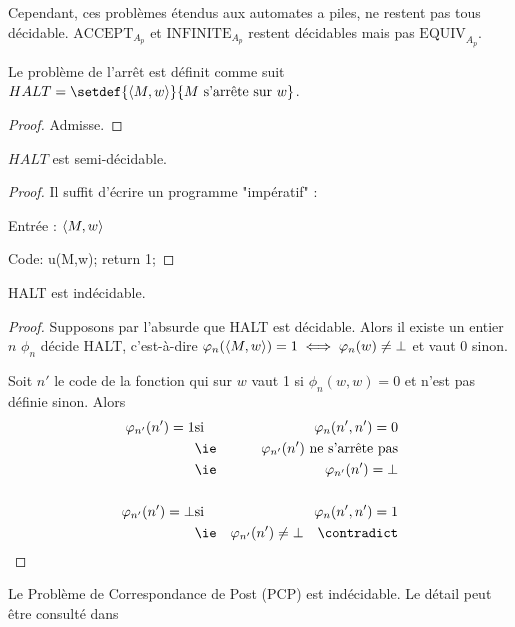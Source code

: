 Cependant, ces problèmes étendus aux automates a piles, ne restent pas tous décidable.
$\text{ACCEPT}_{A_p}$ et $\text{INFINITE}_{A_p}$ restent décidables mais pas $\text{EQUIV}_{A_p}$.

\begin{definition}
	Le problème de l'arrêt est définit comme suit $HALT = \setdef {\encode{M,w}} {M \text{ s'arrête sur } w}$.
\end{definition}

\begin{proof}
	Admisse.
\end{proof}

\begin{prop}
	$HALT$ est semi-décidable.
\end{prop}

\begin{proof}
	Il suffit d'écrire un programme "impératif" :

	Entrée : $\left\langle M,w\right\rangle$

	Code:
	u(M,w);
	return 1;

\end{proof}

\begin{prop}
	HALT est indécidable.
\end{prop}

\begin{proof}
	Supposons par l'absurde que HALT est décidable. Alors il existe un entier $n$ \tq $\phi_n$ décide HALT, c'est-à-dire
	$ \varphi_n(\left\langle M, w\right\rangle ) = 1 \iff \varphi_n(w) \neq \bot $ et vaut $0$ sinon.

	Soit $n'$ le code de la fonction qui sur $w$ vaut 1 si $\phi_n (w,w) = 0 $ et n'est pas définie sinon. Alors
	\begin{eqnarray*}
		\phi_{n'}(n') = 1 & \text{si} & \phi_n(n',n') = 0\\
		&\text{\ie}& \phi_{n'}(n') \text{ ne s'arrête pas} \\
		&\text{\ie}& \phi_{n'}(n') = \bot\\\\
		\phi_{n'}(n') = \bot & \text{si} & \phi_n(n',n') = 1\\
		&\text{\ie}& \phi_{n'}(n') \neq \bot \quad \contradict
	\end{eqnarray*}
\end{proof}

\begin{exemple}
	Le Problème de Correspondance de Post (PCP) est indécidable. Le détail peut être consulté dans \cite[Chapter~5.2]{sipser}
\end{exemple}
